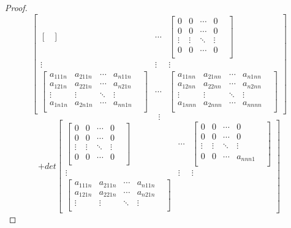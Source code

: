 \documentclass{amsc}          %
\numberwithin{equation}{section} %
\begin{document}
\begin{proof}
$$\begin{bmatrix}
\begin{bmatrix}
\end{bmatrix}&
\cdots&
 \begin{bmatrix}
   0& 0&\cdots&0\\
   0& 0&\cdots&0\\
  \vdots&\vdots&\ddots &\vdots& \\
0& 0&\cdots&0\\
\end{bmatrix}\\
\vdots&\vdots&\vdots\\
\begin{bmatrix}
  a_{111n}& a_{211n}&\cdots&a_{n11n}\\
  a_{121n}& a_{221n}&\cdots&a_{n21n}\\
  \vdots&\vdots&\ddots &\vdots& \\
  a_{1n1n}& a_{2n1n}&\cdots&a_{nn1n}\\
  \end{bmatrix}&
\cdots&
\begin{bmatrix}
  a_{11nn}& a_{21nn}&\cdots&a_{n1nn}\\
  a_{12nn}& a_{22nn}&\cdots&a_{n2nn}\\
  \vdots&\vdots&\ddots &\vdots& \\
   a_{1nnn}& a_{2nnn}&\cdots&a_{nnnn}\\
\end{bmatrix}
\end{bmatrix}$$
 $$\vdots$$
$$+det\begin{bmatrix}
  \begin{bmatrix}
   0& 0&\cdots&0\\
   0& 0&\cdots&0\\
  \vdots&\vdots&\ddots &\vdots& \\
0& 0&\cdots&0\\
\end{bmatrix}&
\cdots&
 \begin{bmatrix}
   0& 0&\cdots&0\\
   0& 0&\cdots&0\\
  \vdots&\vdots&\ddots &\vdots& \\
0& 0&\cdots&a_{nnn1}\\
\end{bmatrix}\\
\vdots&\vdots&\vdots\\
\begin{bmatrix}
  a_{111n}& a_{211n}&\cdots&a_{n11n}\\
  a_{121n}& a_{221n}&\cdots&a_{n21n}\\
  \vdots&\vdots&\ddots &\vdots& \\

\end{bmatrix}
\end{bmatrix}$$
\end{proof}
\end{document}
